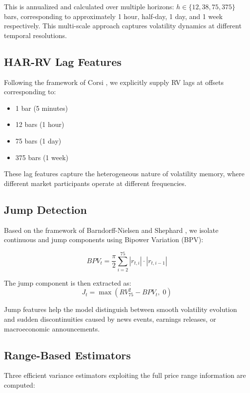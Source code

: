 This is annualized and calculated over multiple horizons: $h \in \{12, 38, 75, 375\}$ bars, corresponding to approximately 1 hour, half-day, 1 day, and 1 week respectively. This multi-scale approach captures volatility dynamics at different temporal resolutions.

\subsection{HAR-RV Lag Features}

Following the framework of Corsi \cite{corsi2009}, we explicitly supply RV lags at offsets corresponding to:
\begin{itemize}
    \item 1 bar (5 minutes)
    \item 12 bars (1 hour)
    \item 75 bars (1 day)
    \item 375 bars (1 week)
\end{itemize}

These lag features capture the heterogeneous nature of volatility memory, where different market participants operate at different frequencies.

\subsection{Jump Detection}

Based on the framework of Barndorff-Nielsen and Shephard \cite{bns2004}, we isolate continuous and jump components using Bipower Variation (BPV):

\begin{equation}
BPV_t = \frac{\pi}{2} \sum_{i=2}^{75} |r_{t,i}| \cdot |r_{t,i-1}|
\end{equation}

The jump component is then extracted as:
\begin{equation}
J_t = \max(RV_{75}^2 - BPV_t,\; 0)
\end{equation}

Jump features help the model distinguish between smooth volatility evolution and sudden discontinuities caused by news events, earnings releases, or macroeconomic announcements.

\subsection{Range-Based Estimators}

Three efficient variance estimators exploiting the full price range information are computed:

